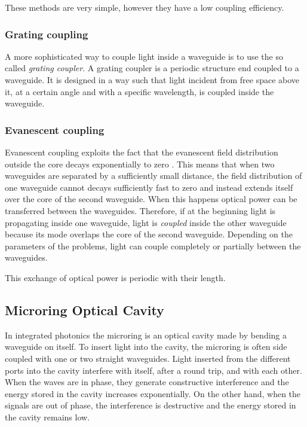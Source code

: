 These methods are very simple, however they have a low coupling efficiency. %

\subsubsection{Grating coupling}
\label{sssec:grating_coupling}
A more sophisticated way to couple light inside a waveguide is to use the so called \textit{grating coupler}.
A grating coupler is a periodic structure end coupled to a waveguide.
It is designed in a way such that light incident from free space above it, at a certain angle and with a specific wavelength, is coupled inside the waveguide.

\subsubsection{Evanescent coupling}
\label{sssec:evanescent_coupling}
Evanescent coupling exploits the fact that the evanescent field distribution outside the core decays exponentially to zero \cite{Reed2004}.
This means that when two waveguides are separated by a sufficiently small distance, the field distribution of one waveguide cannot decays sufficiently fast to zero and instead extends itself over the core of the second waveguide.
When this happens optical power can be transferred between the waveguides.
Therefore, if at the beginning light is propagating inside one waveguide, light is \textit{coupled} inside the other waveguide because its mode overlaps the core of the second waveguide.
Depending on the parameters of the problems, light can couple completely or partially between the waveguides.

This exchange of optical power is periodic with their length.

\subsection{Microring Optical Cavity}
\label{ssec:Microring_Optical_Cavity}
In integrated photonics the microring is an optical cavity made by bending a waveguide on itself.
To insert light into the cavity, the microring is often side coupled with one or two straight waveguides.
Light inserted from the different ports into the cavity interfere with itself, after a round trip, and with each other.
When the waves are in phase, they generate constructive interference and the energy stored in the cavity increases exponentially.
On the other hand, when the signals are out of phase, the interference is destructive and the energy stored in the cavity remains low.


